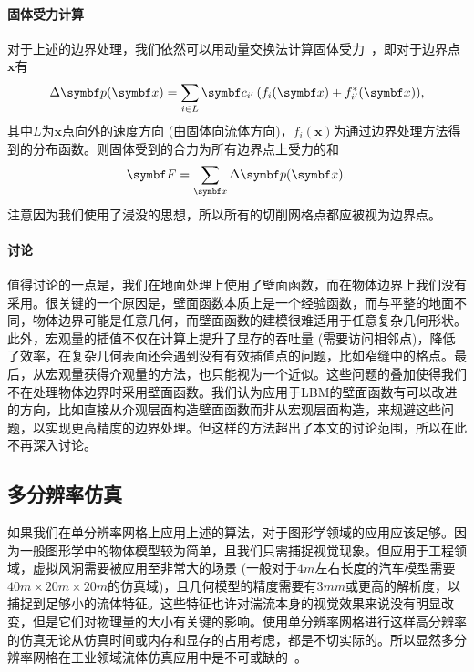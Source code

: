 \paragraph{固体受力计算}
对于上述的边界处理，我们依然可以用动量交换法计算固体受力~\citep{Ladd-1994, Mei-2002}，即对于边界点$\bm{x}$有
\begin{equation}
    \Delta \bm{p}(\bm{x})= \sum_{i\in L} \bm{c}_{i'}\,(f_{i}(\bm{x}) + f^*_{i'}(\bm{x})),\vspace*{-1.5mm}
\end{equation}
其中$L$为$\bm{x}$点向外的速度方向 (由固体向流体方向)，$f_{i}(\bm{x})$为通过边界处理方法得到的分布函数。则固体受到的合力为所有边界点上受力的和
\begin{equation}
    \bm{F} = \sum_{\bm{x}} \Delta \bm{p}(\bm{x}).\vspace*{-1mm}
\end{equation}
注意因为我们使用了浸没的思想，所以所有的切削网格点都应被视为边界点。

\paragraph{讨论}
值得讨论的一点是，我们在地面处理上使用了壁面函数，而在物体边界上我们没有采用。很关键的一个原因是，壁面函数本质上是一个经验函数，而与平整的地面不同，物体边界可能是任意几何，而壁面函数的建模很难适用于任意复杂几何形状。此外，宏观量的插值不仅在计算上提升了显存的吞吐量 (需要访问相邻点)，降低了效率，在复杂几何表面还会遇到没有有效插值点的问题，比如窄缝中的格点。最后，从宏观量获得介观量的方法，也只能视为一个近似。这些问题的叠加使得我们不在处理物体边界时采用壁面函数。我们认为应用于LBM的壁面函数有可以改进的方向，比如直接从介观层面构造壁面函数而非从宏观层面构造，来规避这些问题，以实现更高精度的边界处理。但这样的方法超出了本文的讨论范围，所以在此不再深入讨论。

\subsection{多分辨率仿真}
\label{sec:multi-res}
如果我们在单分辨率网格上应用上述的算法，对于图形学领域的应用应该足够。因为一般图形学中的物体模型较为简单，且我们只需捕捉视觉现象。但应用于工程领域，虚拟风洞需要被应用至非常大的场景 (一般对于$4m$左右长度的汽车模型需要$40m\times20m\times20m$的仿真域)，且几何模型的精度需要有$3mm$或更高的解析度，以捕捉到足够小的流体特征。这些特征也许对湍流本身的视觉效果来说没有明显改变，但是它们对物理量的大小有关键的影响。使用单分辨率网格进行这样高分辨率的仿真无论从仿真时间或内存和显存的占用考虑，都是不切实际的。所以显然多分辨率网格在工业领域流体仿真应用中是不可或缺的~\citep{Hou-2019,Aultman-2022,Romani-2022}。

